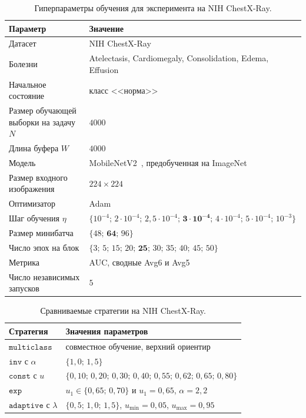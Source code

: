 \documentclass[a4paper,14pt,oneside,openany]{extarticle}
\begin{document}
\begin{table}[h!]
\centering
\small
\caption{Гиперпараметры обучения для эксперимента на NIH ChestX-Ray.}
\label{tab:hyp_cxr_setup}
\begin{tabularx}{\linewidth}{lX}
\toprule
Параметр & Значение \\
\midrule
Датасет & NIH ChestX-Ray~\cite{wang2017chestx} \\
Болезни & Atelectasis, Cardiomegaly, Consolidation, Edema, Effusion \\
Начальное состояние & класс <<норма>> \\
Размер обучающей выборки на задачу $N$ & $4000$ \\
Длина буфера $W$ & $4000$ \\
Модель & MobileNetV2~\cite{sandler2018mobilenetv2}, предобученная на ImageNet \\
Размер входного изображения & $224 \times 224$ \\
Оптимизатор & Adam~\cite{kingma2014adam} \\
Шаг обучения $\eta$ & $\{10^{-4};\, 2\cdot 10^{-4};\, 2{,}5\cdot 10^{-4};\, \mathbf{3\cdot 10^{-4}};\, 4\cdot 10^{-4};\, 5\cdot 10^{-4};\, 10^{-3}\}$ \\
Размер минибатча & $\{48;\, \mathbf{64};\, 96\}$ \\
Число эпох на блок & $\{3;\, 5;\, 15;\, 20;\, \mathbf{25};\, 30;\, 35;\, 40;\, 45;\, 50\}$ \\
Метрика & AUC, сводные Avg6 и Avg5 \\
Число независимых запусков & $5$ \\
\bottomrule
\end{tabularx}
\end{table}
\begin{table}[h!]
\centering
\small
\caption{Сравниваемые стратегии на NIH ChestX-Ray.}
\label{tab:hyp_cxr_strategies}
\begin{tabularx}{\linewidth}{lX}
\toprule
Стратегия & Значения параметров \\
\midrule
$\texttt{multiclass}$ & совместное обучение, верхний ориентир \\
$\texttt{inv}$ с $\alpha$ & $\{1{,}0;\, 1{,}5\}$ \\
$\texttt{const}$ с $u$ & $\{0{,}10;\, 0{,}20;\, 0{,}30;\, 0{,}40;\, 0{,}55;\, 0{,}62;\, 0{,}65;\, 0{,}80\}$ \\
$\texttt{exp}$ & $u_1 \in \{0{,}65;\, 0{,}70\}$ и $u_1 = 0{,}65$, $\alpha = 2{,}2$ \\
$\texttt{adaptive}$ с $\lambda$ & $\{0{,}5;\, 1{,}0;\, 1{,}5\}$, $u_{\min} = 0{,}05$, $u_{\max} = 0{,}95$ \\
\bottomrule
\end{tabularx}
\end{table}
\end{document}
